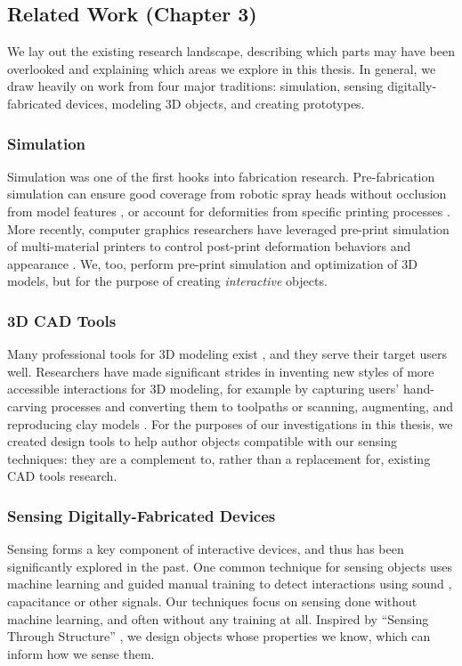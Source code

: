 \subsection{Related Work (Chapter 3)}

We lay out the existing research landscape, describing which parts may have been overlooked and explaining which areas we explore in this thesis. In general, we draw heavily on work from four major traditions: simulation, sensing digitally-fabricated devices, modeling 3D objects, and creating prototypes.

\subsubsection{Simulation}
Simulation was one of the first hooks into fabrication research. Pre-fabrication simulation can ensure good coverage from robotic spray heads without occlusion from model features \cite{gursoz-noodles}, or account for deformities from specific printing processes \cite{hsu-numerical}. More recently, computer graphics researchers have leveraged pre-print simulation of multi-material printers to control post-print deformation behaviors \cite{bickel-deformation} and appearance \cite{lan-appearance}. We, too, perform pre-print simulation and optimization of 3D models, but for the purpose of creating \emph{interactive} objects.

\subsubsection{3D CAD Tools}
Many professional tools for 3D modeling exist \cite{solidworks, rhino}, and they serve their target users well. Researchers have made significant strides in inventing new styles of more accessible interactions for 3D modeling, for example by capturing users' hand-carving processes and converting them to toolpaths \cite{willis-interactive} or scanning, augmenting, and reproducing clay models \cite{savage-mmarks}. For the purposes of our investigations in this thesis, we created design tools to help author objects compatible with our sensing techniques: they are a complement to, rather than a replacement for, existing CAD tools research.

\subsubsection{Sensing Digitally-Fabricated Devices}
Sensing forms a key component of interactive devices, and thus has been significantly explored in the past. One common technique for sensing objects uses machine learning and guided manual training to detect interactions using sound \cite{ono-touchandactivate,laput-acoustruments}, capacitance \cite{sato-touche} or other signals. Our techniques focus on sensing done without machine learning, and often without any training at all. Inspired by ``Sensing Through Structure'' \cite{slyper-structure}, we design objects whose properties we know, which can inform how we sense them.

